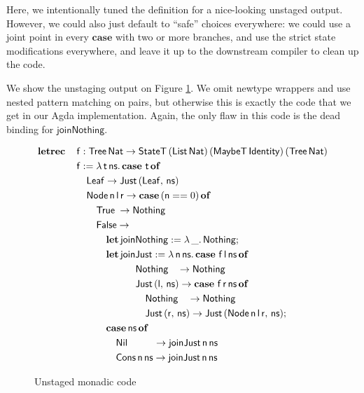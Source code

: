 \documentclass[acmsmall]{acmart}
\newcommand{\msf}[1]{{\mathsf{#1}}}
\newcommand{\mbf}[1]{{\mathbf{#1}}}
\newcommand{\ind}{\hspace{1em}}
\newcommand{\lam}{\lambda\,}
\newcommand{\letrec}{\mbf{letrec}\,}
\newcommand{\of}{\mbf{of}\,}
\newcommand{\letdef}{\mbf{let\,}}
\newcommand{\vn}{\mathsf{n}}
\newcommand{\vf}{\mathsf{f}}
\newcommand{\vt}{\mathsf{t}}
\newcommand{\vr}{\mathsf{r}}
\newcommand{\vl}{\mathsf{l}}
\newcommand{\vns}{\mathsf{ns}}
\newcommand{\List}{\msf{List}}
\newcommand{\Tree}{\msf{Tree}}
\newcommand{\Node}{\msf{Node}}
\newcommand{\Leaf}{\msf{Leaf}}
\newcommand{\Nil}{\msf{Nil}}
\newcommand{\Cons}{\msf{Cons}}
\newcommand{\case}{\mbf{case\,}}
\newcommand{\True}{\msf{True}}
\newcommand{\False}{\msf{False}}
\newcommand{\Nat}{\msf{Nat}}
\newcommand{\MaybeT}{\msf{MaybeT}}
\newcommand{\Nothing}{\msf{Nothing}}
\newcommand{\Just}{\msf{Just}}
\theoremstyle{remark}
\newcommand{\StateT}{\msf{StateT}}
\newcommand{\Identity}{\msf{Identity}}
\begin{document}
Here, we intentionally tuned the definition for a nice-looking unstaged output.
However, we could also just default to ``safe'' choices everywhere: we could use
a joint point in every $\mbf{case}$ with two or more branches, and use the
strict state modifications everywhere, and leave it up to the downstream compiler
to clean up the code.

We show the unstaging output on Figure \ref{fig:codeout}. We omit newtype
wrappers and use nested pattern matching on pairs, but otherwise this is exactly
the code that we get in our Agda implementation. Again, the only flaw in this
code is the dead binding for $\msf{joinNothing}$.
\begin{figure}\label{fig:codeout}
\begin{alignat*}{4}
  &  \letrec &&\vf : \Tree\,\Nat \to \StateT\,(\List\,\Nat)\,(\MaybeT\,\Identity)\,(\Tree\,\Nat) \\
  &          &&\vf := \lam \vt\,\vns.\, \case\,\vt\,\of\\
  &          &&\ind \Leaf \to \Just\,(\Leaf,\,\vns) \\
  &          &&\ind \Node\,\vn\,\vl\,\vr \to \case (\vn == 0)\,\of\\
  &          &&\ind \ind \True \hspace{0.25em}\to \Nothing \\
  &          &&\ind \ind \False \to \\
  &          &&\ind \ind \ind \letdef \msf{joinNothing} := \lam \_.\,\Nothing;\\
  &          &&\ind \ind \ind \letdef \msf{joinJust} := \lam \vn\,\vns.\,\case\,\vf\,\vl\,\vns\,\of\\
  &          &&\ind \ind \ind \ind \ind \ind \Nothing\hspace{0.9em} \to \Nothing\\
  &          &&\ind \ind \ind \ind \ind \ind \Just\,(\vl,\,\vns) \to \case\,\vf\,\vr\,\vns\,\of\\
  &          &&\ind \ind \ind \ind \ind \ind \ind \Nothing\hspace{.95em} \to \Nothing\\
  &          &&\ind \ind \ind \ind \ind \ind \ind \Just\,(\vr,\,\vns) \to \Just\,(\Node\,\vn\,\vl\,\vr,\,\vns);\\
  &          &&\ind \ind \ind \case \vns\,\of\\
  &          &&\ind \ind \ind \ind \Nil \hspace{2.65em}\to \msf{joinJust}\,\vn\,\vns\\
  &          &&\ind \ind \ind \ind \Cons\,\vn\,\vns \to \msf{joinJust}\,\vn\,\vns
\end{alignat*}
\caption{Unstaged monadic code}
\label{fig:codeout}
\end{figure}
\end{document}
